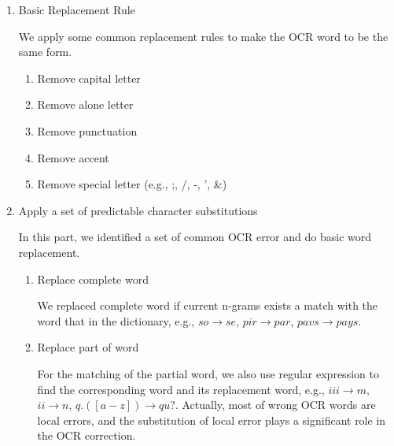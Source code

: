 \begin{enumerate}[1.]
\item Basic Replacement Rule

We apply some common replacement rules to make the OCR word to be the same form.
	\begin{enumerate}[1.]
	\item Remove capital letter
	\item Remove alone letter
	\item Remove punctuation
	\item Remove accent
	\item Remove special letter (e.g., ;, /, -, ', \&)
	\end{enumerate}
\item Apply a set of predictable character substitutions

	In this part, we identified a set of common OCR error and do basic word replacement.

		\begin{enumerate}[1.]
		\item Replace complete word

		We replaced complete word if current n-grams exists a match with the word that in the dictionary, e.g., $so \rightarrow se$, $pir \rightarrow par$, $pavs \rightarrow pays$.

		\item Replace part of word

		For the matching of the partial word, we also use regular expression to find the corresponding word and its replacement word, e.g., $iii \rightarrow m$, $ii \rightarrow n$, $q.([a-z]) \rightarrow qu?$. Actually, most of wrong OCR words are local errors, and the substitution of local error plays a significant role in the OCR correction. 

		\end{enumerate}

\end{enumerate}